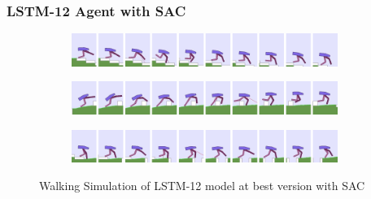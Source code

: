 \documentclass{beamer}
\begin{document}
\begin{frame}
\frametitle{LSTM-12 Agent with SAC}
\begin{figure}[!ht]
	\centering
	\begin{subfigure}{.95\textwidth}
		\centering
		\includegraphics[width=0.95\textwidth]{figures/bipedal/anim/lstm-12-stairs.png}
		\label{fig:anim_lstm_stairs}
	\end{subfigure}
	\begin{subfigure}{.95\textwidth}
		\centering
		\includegraphics[width=0.95\textwidth]{figures/bipedal/anim/lstm-12-hurdle.png}
		\label{fig:anim_lstm_hurdle}
	\end{subfigure}
	\begin{subfigure}{.95\textwidth}
		\centering
		\includegraphics[width=0.95\textwidth]{figures/bipedal/anim/lstm-12-pitfall.png}
		\label{fig:anim_lstm_pitfall}
	\end{subfigure}
	\caption{Walking Simulation of LSTM-12 model at best version with SAC}
	\label{fig:lstm_simulation}
\end{figure}
\end{frame}
\end{document}
